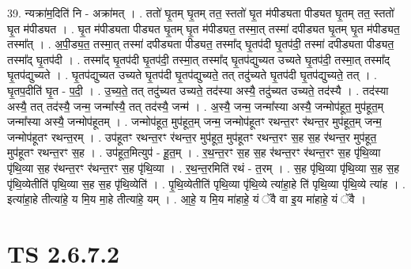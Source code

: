 \documentclass[17pt]{extarticle}
\begin{document}
39. न्यक्रा॑म॒दिति॑ नि - अक्रा॑मत् । . ततो॑ घृ॒तम् घृ॒तम् तत॒ स्ततो॑ घृ॒त म॑पीड्यता पीड्यत घृ॒तम् तत॒ स्ततो॑ घृ॒त म॑पीड्यत । . घृ॒त म॑पीड्यता पीड्यत घृ॒तम् घृ॒त म॑पीड्यत॒ तस्मा॒त् तस्मा॑ दपीड्यत घृ॒तम् घृ॒त म॑पीड्यत॒ तस्मा᳚त् । . अ॒पी॒ड्य॒त॒ तस्मा॒त् तस्मा॑ दपीड्यता पीड्यत॒ तस्मा᳚द् घृ॒तप॑दी घृ॒तप॑दी॒ तस्मा॑ दपीड्यता पीड्यत॒ तस्मा᳚द् घृ॒तप॑दी । . तस्मा᳚द् घृ॒तप॑दी घृ॒तप॑दी॒ तस्मा॒त् तस्मा᳚द् घृ॒तप॑द्युच्यत उच्यते घृ॒तप॑दी॒ तस्मा॒त् तस्मा᳚द् घृ॒तप॑द्युच्यते । . घृ॒तप॑द्युच्यत उच्यते घृ॒तप॑दी घृ॒तप॑द्युच्यते॒ तत् तदु॑च्यते घृ॒तप॑दी घृ॒तप॑द्युच्यते॒ तत् । . घृ॒तप॒दीति॑ घृ॒त - प॒दी॒ । . उ॒च्य॒ते॒ तत् तदु॑च्यत उच्यते॒ तद॑स्या अस्यै॒ तदु॑च्यत उच्यते॒ तद॑स्यै । . तद॑स्या अस्यै॒ तत् तद॑स्यै॒ जन्म॒ जन्मा᳚स्यै॒ तत् तद॑स्यै॒ जन्म॑ । . अ॒स्यै॒ जन्म॒ जन्मा᳚स्या अस्यै॒ जन्मोप॑हूत॒ मुप॑हूत॒म् जन्मा᳚स्या अस्यै॒ जन्मोप॑हूतम् । . जन्मोप॑हूत॒ मुप॑हूत॒म् जन्म॒ जन्मोप॑हूतꣳ रथन्त॒रꣳ र॑थन्त॒र मुप॑हूत॒म् जन्म॒ जन्मोप॑हूतꣳ रथन्त॒रम् । . उप॑हूतꣳ रथन्त॒रꣳ र॑थन्त॒र मुप॑हूत॒ मुप॑हूतꣳ रथन्त॒रꣳ स॒ह स॒ह र॑थन्त॒र मुप॑हूत॒ मुप॑हूतꣳ रथन्त॒रꣳ स॒ह । . उप॑हूत॒मित्युप॑ - हू॒त॒म् । . र॒थ॒न्त॒रꣳ स॒ह स॒ह र॑थन्त॒रꣳ र॑थन्त॒रꣳ स॒ह पृ॑थि॒व्या पृ॑थि॒व्या स॒ह र॑थन्त॒रꣳ र॑थन्त॒रꣳ स॒ह पृ॑थि॒व्या । . र॒थ॒न्त॒रमिति॑ रथं - त॒रम् । . स॒ह पृ॑थि॒व्या पृ॑थि॒व्या स॒ह स॒ह पृ॑थि॒व्येतीति॑ पृथि॒व्या स॒ह स॒ह पृ॑थि॒व्येति॑ । . पृ॒थि॒व्येतीति॑ पृथि॒व्या पृ॑थि॒व्ये त्या॑हा॒हे ति॑ पृथि॒व्या पृ॑थि॒व्ये त्या॑ह । . इत्या॑हा॒हे तीत्या॑हे॒ य मि॒य मा॒हे तीत्या॑हे॒ यम् । . आ॒हे॒ य मि॒य मा॑हाहे॒ यं ॅवै वा इ॒य मा॑हाहे॒ यं ॅवै । \newline
\pagebreak
{}

\section{ TS 2.6.7.2 }
\end{document}
